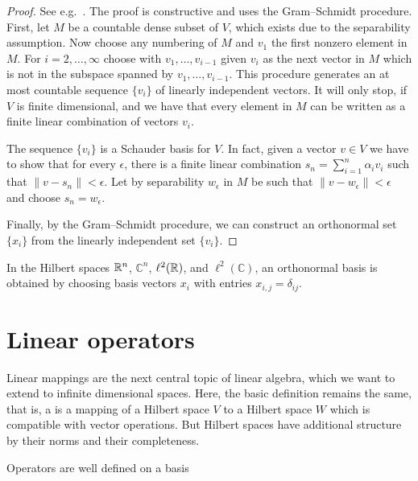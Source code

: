 \begin{proof}
  See e.g.~\cite{Yosida80}. The proof is constructive and uses the
  Gram--Schmidt procedure. First, let $M$ be a countable dense subset
  of $V$, which exists due to the separability assumption. Now choose
  any numbering of $M$ and $v_1$ the first nonzero element in
  $M$. For $i=2,\dots,\infty$ choose with $v_1,\dots,v_{i-1}$ given
  $v_i$ as the next vector in $M$ which is not in the subspace spanned
  by $v_1,\dots,v_{i-1}$. This procedure generates an at most
  countable sequence $\{v_i\}$ of linearly independent vectors. It
  will only stop, if $V$ is finite dimensional, and we have that every
  element in $M$ can be written as a finite linear combination of
  vectors $v_i$.
  
  The sequence $\{v_i\}$ is a Schauder basis for $V$. In fact, given a
  vector $v\in V$ we have to show that for every $\epsilon$, there is
  a finite linear combination $s_n = \sum_{i=1}^n \alpha_i v_i$ such
  that $\|v-s_n\| < \epsilon$. Let by separability $w_\epsilon$ in $M$
  be such that $\|v-w_\epsilon\| < \epsilon$ and choose $s_n =
  w_\epsilon$.
  
  Finally, by the Gram--Schmidt procedure, we can construct an
  orthonormal set $\{x_i\}$ from the linearly independent set $\{v_i\}$.
\end{proof}

\begin{example}
  In the Hilbert spaces $\mathbb R^n$, $\mathbb C^n$, $\ell^2(\mathbb R)$, and
  $\ell^2(\mathbb C)$, an orthonormal basis is obtained by choosing
  basis vectors $x_i$ with entries $x_{i,j} = \delta_{ij}$.
\end{example}

\section{Linear operators}

\begin{intro}
  Linear mappings are the next central topic of linear algebra, which
  we want to extend to infinite dimensional spaces. Here, the basic
  definition remains the same, that is, a  is
  a mapping of a Hilbert space $V$ to a Hilbert space $W$ which is
  compatible with vector operations. But Hilbert spaces have
  additional structure by their norms and their completeness.
\end{intro}

\begin{todo}
  Operators are well defined on a basis
\end{todo}


